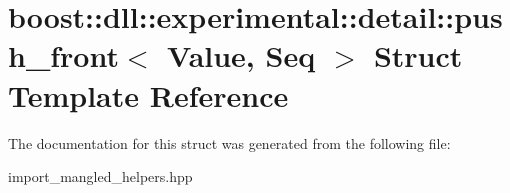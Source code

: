 \hypertarget{a01436}{}\section{boost\+:\+:dll\+:\+:experimental\+:\+:detail\+:\+:push\+\_\+front$<$ Value, Seq $>$ Struct Template Reference}
\label{a01436}


The documentation for this struct was generated from the following file\+:\begin{DoxyCompactItemize}
\item 
import\+\_\+mangled\+\_\+helpers.\+hpp\end{DoxyCompactItemize}
